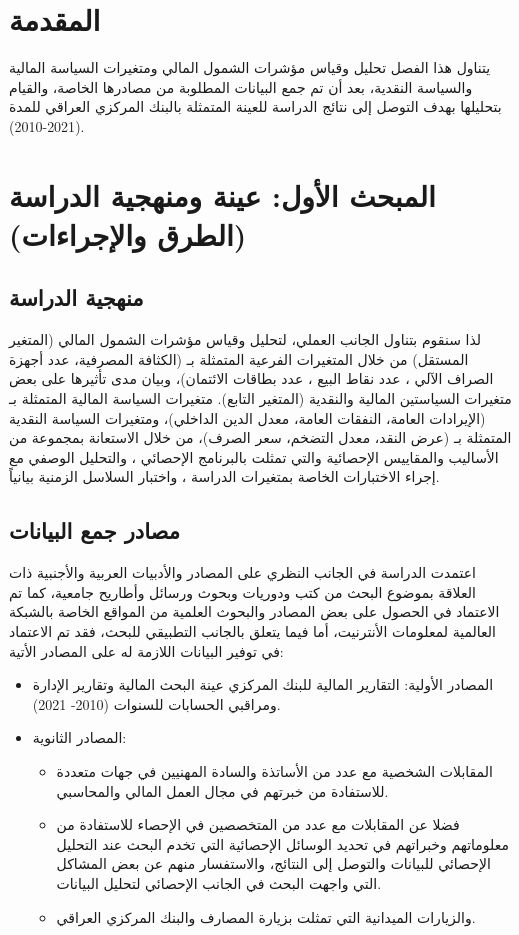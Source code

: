 \documentclass[10pt,a4paper]{report}
\begin{document}
\begin{doublespacing}
\section*{المقدمة}
يتناول هذا الفصل تحليل وقياس مؤشرات الشمول المالي ومتغيرات السياسة المالية والسياسة النقدية، بعد أن تم جمع البيانات المطلوبة من مصادرها الخاصة، والقيام بتحليلها بهدف التوصل إلى نتائج الدراسة للعينة المتمثلة بالبنك المركزي العراقي للمدة (2021-2010).
\section{المبحث الأول: عينة ومنهجية الدراسة (الطرق والإجراءات)}
\subsection{منهجية الدراسة}
لذا سنقوم بتناول الجانب العملي، لتحليل وقياس مؤشرات الشمول المالي (المتغير المستقل) من خلال المتغيرات الفرعية المتمثلة بـ (الكثافة المصرفية، عدد أجهزة الصراف الآلي ، عدد نقاط البيع ، عدد بطاقات الائتمان)، وبيان مدى تأثيرها على بعض متغيرات السياستين المالية والنقدية (المتغير التابع). متغيرات السياسة المالية المتمثلة بـ (الإيرادات العامة، النفقات العامة، معدل الدين الداخلي)، ومتغيرات السياسة النقدية المتمثلة بـ (عرض النقد، معدل التضخم، سعر الصرف)، من خلال الاستعانة بمجموعة من الأساليب والمقاييس الإحصائية والتي تمثلت بالبرنامج الإحصائي ، والتحليل الوصفي مع إجراء الاختبارات الخاصة بمتغيرات الدراسة ، واختبار السلاسل الزمنية بيانياً.
\subsection{مصادر جمع البيانات}
اعتمدت الدراسة في الجانب النظري على المصادر والأدبيات العربية والأجنبية ذات العلاقة بموضوع البحث من كتب ودوريات وبحوث ورسائل وأطاريح جامعية، كما تم الاعتماد في الحصول على بعض المصادر والبحوث العلمية من المواقع الخاصة بالشبكة العالمية لمعلومات الأنترنيت، أما فيما يتعلق بالجانب التطبيقي للبحث، فقد تم الاعتماد في توفير البيانات اللازمة له على المصادر الأتية: 
\begin{itemize}
	\item المصادر الأولية: التقارير المالية للبنك المركزي عينة البحث المالية وتقارير الإدارة ومراقبي الحسابات للسنوات (2010- 2021).
	\item المصادر الثانوية: 
	\begin{itemize}
		\item المقابلات الشخصية مع عدد من الأساتذة والسادة المهنيين في جهات متعددة للاستفادة من خبرتهم في مجال العمل المالي والمحاسبي.
		\item فضلا عن المقابلات مع عدد من المتخصصين في الإحصاء للاستفادة من معلوماتهم وخبراتهم في تحديد الوسائل الإحصائية التي تخدم البحث عند التحليل الإحصائي للبيانات والتوصل إلى النتائج، والاستفسار منهم عن بعض المشاكل التي واجهت البحث في الجانب الإحصائي لتحليل البيانات.
		\item والزيارات الميدانية التي تمثلت بزيارة المصارف والبنك المركزي العراقي.
	\end{itemize}
\end{itemize}

\end{doublespacing}
\end{document}
